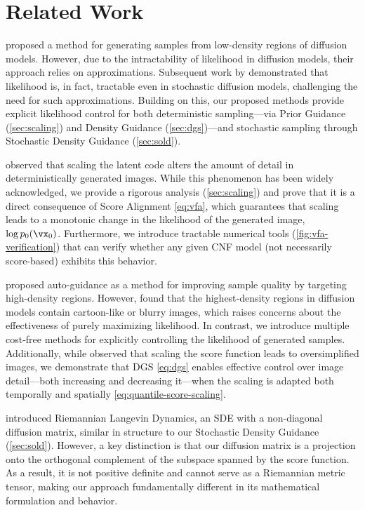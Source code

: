 \section{Related Work}
\label{sec:related-work}

\citet{sehwag2022generating} proposed a method for generating samples from low-density regions of diffusion models. However, due to the intractability of likelihood in diffusion models, their approach relies on approximations. Subsequent work by \citet{karczewski2024diffusion} demonstrated that likelihood is, in fact, tractable even in stochastic diffusion models, challenging the need for such approximations. Building on this, our proposed methods provide explicit likelihood control for both deterministic sampling—via Prior Guidance (\autoref{sec:scaling}) and Density Guidance (\autoref{sec:dgs})—and stochastic sampling through Stochastic Density Guidance (\autoref{sec:sold}).

\citet{song2021scorebased} observed that scaling the latent code alters the amount of detail in deterministically generated images.
While this phenomenon has been widely acknowledged, we provide a rigorous analysis (\autoref{sec:scaling}) and prove that it is a direct consequence of Score Alignment \autoref{eq:vfa}, which guarantees that scaling leads to a monotonic change in the likelihood of the generated image, $\log p_0(\vx_0)$.
Furthermore, we introduce tractable numerical tools (\autoref{fig:vfa-verification}) that can verify whether any given CNF model (not necessarily score-based) exhibits this behavior.

\citet{karras2024guiding} proposed auto-guidance as a method for improving sample quality by targeting high-density regions. However, \citet{karczewski2024diffusion} found that the highest-density regions in diffusion models contain cartoon-like or blurry images, which raises concerns about the effectiveness of purely maximizing likelihood. In contrast, we introduce multiple cost-free methods for explicitly controlling the likelihood of generated samples. Additionally, while \citet{karras2024guiding} observed that scaling the score function leads to oversimplified images, we demonstrate that DGS \autoref{eq:dgs} enables effective control over image detail—both increasing and decreasing it—when the scaling is adapted both temporally and spatially \autoref{eq:quantile-score-scaling}.

\citet{yu2023scalable} introduced Riemannian Langevin Dynamics, an SDE with a non-diagonal diffusion matrix, similar in structure to our Stochastic Density Guidance (\autoref{sec:sold}). However, a key distinction is that our diffusion matrix is a projection onto the orthogonal complement of the subspace spanned by the score function. As a result, it is not positive definite and cannot serve as a Riemannian metric tensor, making our approach fundamentally different in its mathematical formulation and behavior.

